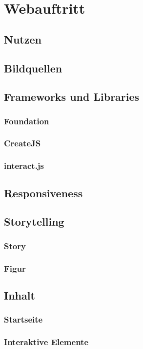 \chapter{Webauftritt}
\renewcommand{\kapitelautor}{Autor: Hatice Akyokus}
\section{Nutzen}
\section{Bildquellen}
\section{Frameworks und Libraries}
\subsection{Foundation}
\subsection{CreateJS}
\subsection{interact.js}
\section{Responsiveness}
\section{Storytelling}
\subsection{Story}
\subsection{Figur}

\section{Inhalt}
\subsection{Startseite}

\subsection{Interaktive Elemente}

